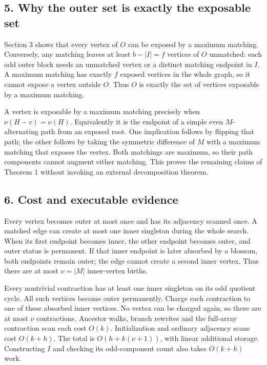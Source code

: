 \hypertarget{af-43f6530146-why-the-outer-set-is-exactly-the-exposable-set}{%
\subsection{5. Why the outer set is exactly the exposable set}\label{af-43f6530146-why-the-outer-set-is-exactly-the-exposable-set}}

Section 3 shows that every vertex of \(O\) can be exposed by a maximum matching. Conversely, any matching leaves at least \(b-|I|=f\) vertices of \(O\) unmatched: each odd outer block needs an unmatched vertex or a distinct matching endpoint in \(I\). A maximum matching has exactly \(f\) exposed vertices in the whole graph, so it cannot expose a vertex outside \(O\). Thus \(O\) is exactly the set of vertices exposable by a maximum matching.

A vertex is exposable by a maximum matching precisely when \(\nu(H-v)=\nu(H)\). Equivalently it is the endpoint of a simple even \(M\)-alternating path from an exposed root. One implication follows by flipping that path; the other follows by taking the symmetric difference of \(M\) with a maximum matching that exposes the vertex. Both matchings are maximum, so their path components cannot augment either matching. This proves the remaining claims of Theorem 1 without invoking an external decomposition theorem.

\hypertarget{af-43f6530146-cost-and-executable-evidence}{%
\subsection{6. Cost and executable evidence}\label{af-43f6530146-cost-and-executable-evidence}}

Every vertex becomes outer at most once and has its adjacency scanned once. A matched edge can create at most one inner singleton during the whole search. When its first endpoint becomes inner, the other endpoint becomes outer, and outer status is permanent. If that inner endpoint is later absorbed by a blossom, both endpoints remain outer; the edge cannot create a second inner vertex. Thus there are at most \(\nu=|M|\) inner-vertex births.

Every nontrivial contraction has at least one inner singleton on its odd quotient cycle. All such vertices become outer permanently. Charge each contraction to one of these absorbed inner vertices. No vertex can be charged again, so there are at most \(\nu\) contractions. Ancestor walks, branch rewrites and the full-array contraction scan each cost \(O(k)\). Initialization and ordinary adjacency scans cost \(O(k+h)\). The total is \(O(h+k(\nu+1))\), with linear additional storage. Constructing \(I\) and checking its odd-component count also takes \(O(k+h)\) work.

